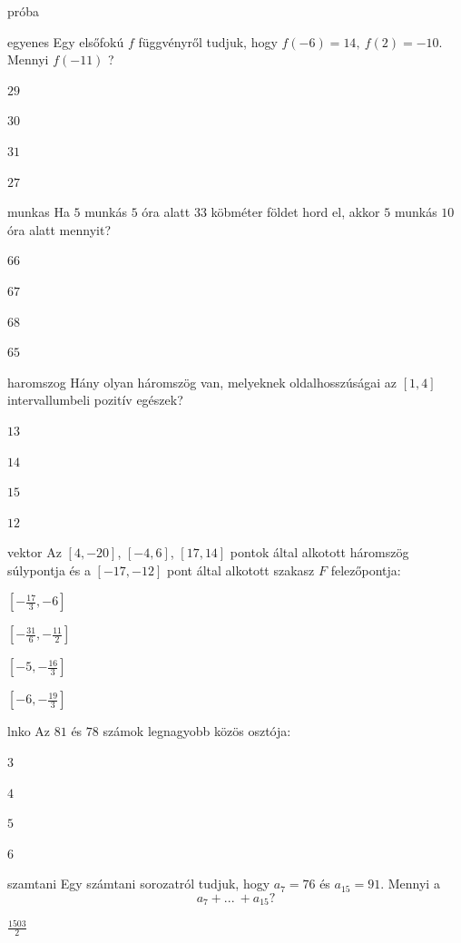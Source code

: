 \documentclass[12pt]{article}
\begin{document}
\begin{quiz}{próba}

\begin{multi}{egyenes}
Egy elsőfokú $f$ függvényről tudjuk, hogy $f(-6)=14,\ f(2)=-10$. Mennyi $f(-11)$ ?
\item* $29$
\item  $30$
\item  $31$
\item  $27$
\end{multi}
\begin{multi}{munkas}
Ha $5$ munkás $5$ óra alatt $33$ köbméter földet hord el, akkor
$5$ munkás $10$ óra alatt mennyit? 

\item* $66$
\item  $67$
\item  $68$
\item  $65$
\end{multi}
\begin{multi}{haromszog}
Hány olyan háromszög van, melyeknek oldalhosszúságai az $[1,4]$ 
intervallumbeli pozitív egészek?
\item* $13$
\item  $14$
\item  $15$
\item  $12$
\end{multi}
\begin{multi}{vektor}
Az $\left[4, -20\right]$, $\left[-4, 6\right]$, $\left[17, 14\right]$ pontok által alkotott háromszög súlypontja és a $\left[-17, -12\right]$ pont 
által alkotott szakasz $F$ felezőpontja:
\item* $\left[-\frac{17}{3}, -6\right]$
\item  $\left[-\frac{31}{6}, -\frac{11}{2}\right]$
\item  $\left[-5, -\frac{16}{3}\right]$
\item  $\left[-6, -\frac{19}{3}\right]$
\end{multi}
\begin{multi}{lnko}
Az $81$ és $78$ számok legnagyobb közös osztója:
\item* $3$
\item  $4$
\item  $5$
\item  $6$
\end{multi}
\begin{multi}{szamtani}
Egy számtani sorozatról tudjuk, hogy $a_{7}=76$ és $a_{15}=91$. Mennyi a 
$$
a_{7}+{...\:} +a_{15}?
$$
\item* $\frac{1503}{2}$

\end{multi}
\end{quiz}
\end{document}
